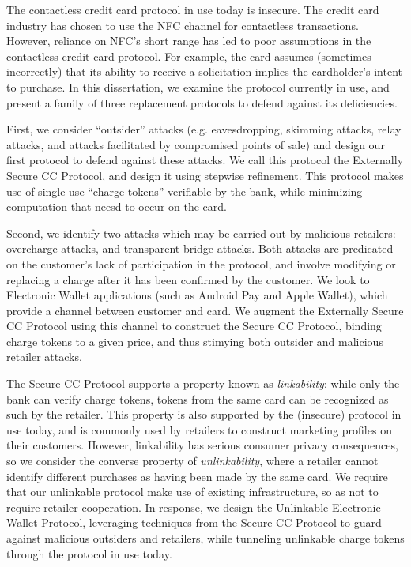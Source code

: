 The contactless credit card protocol in use today is insecure.
The credit card industry has chosen to use the NFC channel for contactless transactions.
However, reliance on NFC's short range has led to poor assumptions in the contactless credit card protocol.
For example, the card assumes (sometimes incorrectly) that its ability to receive a solicitation implies the cardholder's intent to purchase.
In this dissertation, we examine the protocol currently in use,
    and present a family of three replacement protocols to defend against its deficiencies.

First, we consider ``outsider'' attacks (e.g. eavesdropping, skimming attacks, relay attacks, and attacks facilitated by compromised points of sale)
    and design our first protocol to defend against these attacks.
We call this protocol the Externally Secure CC Protocol, and design it using stepwise refinement.
This protocol makes use of single-use ``charge tokens'' verifiable by the bank, while minimizing computation that neesd to occur on the card.

Second, we identify two attacks which may be carried out by malicious retailers:
    overcharge attacks, and transparent bridge attacks.
Both attacks are predicated on the customer's lack of participation in the protocol,
    and involve modifying or replacing a charge after it has been confirmed by the customer.
We look to Electronic Wallet applications (such as Android Pay and Apple Wallet), which provide a channel between customer and card.
We augment the Externally Secure CC Protocol using this channel to construct the Secure CC Protocol,
    binding charge tokens to a given price, and thus stimying both outsider and malicious retailer attacks.

The Secure CC Protocol supports a property known as \emph{linkability}:
    while only the bank can verify charge tokens, tokens from the same card can be recognized as such by the retailer.
This property is also supported by the (insecure) protocol in use today,
    and is commonly used by retailers to construct marketing profiles on their customers.
However, linkability has serious consumer privacy consequences, so we consider the converse property of
    \emph{unlinkability}, where a retailer cannot identify different purchases as having been made by the same card.
We require that our unlinkable protocol make use of existing infrastructure, so as not to require retailer cooperation.
In response, we design the Unlinkable Electronic Wallet Protocol,
    leveraging techniques from the Secure CC Protocol to guard against malicious outsiders and retailers,
    while tunneling unlinkable charge tokens through the protocol in use today.
